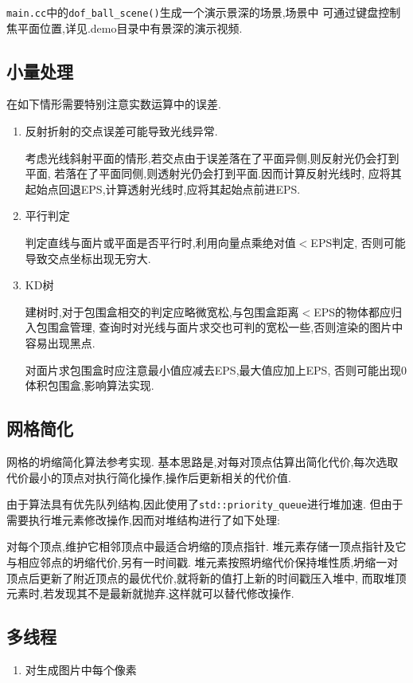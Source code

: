 \verb|main.cc|中的\verb|dof_ball_scene()|生成一个演示景深的场景,场景中
可通过键盘控制焦平面位置,详见.demo目录中有景深的演示视频.

\subsection{小量处理}
在如下情形需要特别注意实数运算中的误差.
\begin{enumerate}
    \item 反射折射的交点误差可能导致光线异常.

      考虑光线斜射平面的情形,若交点由于误差落在了平面异侧,则反射光仍会打到平面,
      若落在了平面同侧,则透射光仍会打到平面.因而计算反射光线时,
      应将其起始点回退EPS,计算透射光线时,应将其起始点前进EPS.

      \item 平行判定

        判定直线与面片或平面是否平行时,利用向量点乘绝对值$<$EPS判定,
        否则可能导致交点坐标出现无穷大.

    \item KD树

      建树时,对于包围盒相交的判定应略微宽松,与包围盒距离$<$EPS的物体都应归入包围盒管理,
      查询时对光线与面片求交也可判的宽松一些,否则渲染的图片中容易出现黑点.

      对面片求包围盒时应注意最小值应减去EPS,最大值应加上EPS,
      否则可能出现0体积包围盒,影响算法实现.
\end{enumerate}

\subsection{网格简化}
网格的坍缩简化算法参考\cite{mesh}实现.
基本思路是,对每对顶点估算出简化代价,每次选取代价最小的顶点对执行简化操作,操作后更新相关的代价值.

由于算法具有优先队列结构,因此使用了\verb|std::priority_queue|进行堆加速.
但由于需要执行堆元素修改操作,因而对堆结构进行了如下处理:

对每个顶点,维护它相邻顶点中最适合坍缩的顶点指针.
堆元素存储一顶点指针及它与相应邻点的坍缩代价,另有一时间戳.
堆元素按照坍缩代价保持堆性质,坍缩一对顶点后更新了附近顶点的最优代价,就将新的值打上新的时间戳压入堆中,
而取堆顶元素时,若发现其不是最新就抛弃.这样就可以替代修改操作.

\subsection{多线程}
\begin{enumerate}
  \item 对生成图片中每个像素
\end{enumerate}
